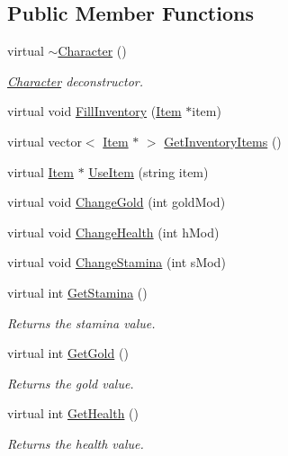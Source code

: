 \subsection*{Public Member Functions}
\begin{DoxyCompactItemize}
\item 
virtual \hyperlink{classCharacter_af3ec409c562122c4464e8a9d3be5f6d2}{$\sim$\-Character} ()
\begin{DoxyCompactList}\small\item\em \hyperlink{classCharacter}{Character} deconstructor. \end{DoxyCompactList}\item 
virtual void \hyperlink{classCharacter_a546635f47f379e4eed59d85d31d85c86}{Fill\-Inventory} (\hyperlink{classItem}{Item} $\ast$item)
\item 
virtual vector$<$ \hyperlink{classItem}{Item} $\ast$ $>$ \hyperlink{classCharacter_a21e35b07fd2bddd94de754f5b8027fcc}{Get\-Inventory\-Items} ()
\item 
virtual \hyperlink{classItem}{Item} $\ast$ \hyperlink{classCharacter_ad13bd70e837024c6f185675d07d28f30}{Use\-Item} (string item)
\item 
virtual void \hyperlink{classCharacter_a5d8e04c875df744a3ea1ca426f8c0e12}{Change\-Gold} (int gold\-Mod)
\item 
virtual void \hyperlink{classCharacter_af0c41714e3a2cb65268fa721846a4939}{Change\-Health} (int h\-Mod)
\item 
virtual void \hyperlink{classCharacter_a50324e5ccb52512dfc69b3775d85c3dc}{Change\-Stamina} (int s\-Mod)
\item 
virtual int \hyperlink{classCharacter_a768bb1dcb73569fed0983bc63aab96ee}{Get\-Stamina} ()
\begin{DoxyCompactList}\small\item\em Returns the stamina value. \end{DoxyCompactList}\item 
virtual int \hyperlink{classCharacter_ab5b7379cf9d7807d882cd86baad34c74}{Get\-Gold} ()
\begin{DoxyCompactList}\small\item\em Returns the gold value. \end{DoxyCompactList}\item 
virtual int \hyperlink{classCharacter_a9b285268567ff7561973db87406e32cb}{Get\-Health} ()
\begin{DoxyCompactList}\small\item\em Returns the health value. \end{DoxyCompactList}\item 

\end{DoxyCompactItemize}
